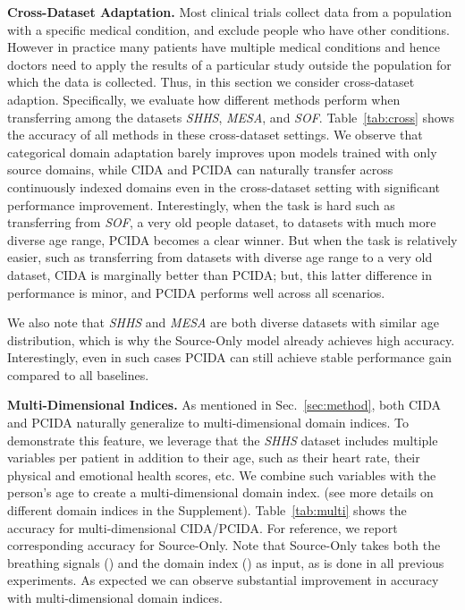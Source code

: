 \documentclass{article}
\newcommand{\tabref}[1]{Table~\ref{#1}}
\newcommand{\secref}[1]{Sec.~\ref{#1}}
\begin{document}
\textbf{Cross-Dataset Adaptation.}
Most clinical trials collect data from a population with a specific medical condition, and exclude people who have other conditions. However in practice many patients have multiple medical conditions and hence doctors need to apply the results of a particular study outside the population for which the data is collected.  Thus, in this section we consider cross-dataset adaption. Specifically, we evaluate how different methods perform when transferring among the datasets \emph{SHHS}, \emph{MESA}, and \emph{SOF}. \tabref{tab:cross} shows the accuracy of all methods in these cross-dataset settings. We observe that categorical domain adaptation barely improves upon models trained with only source domains, while CIDA and PCIDA can naturally transfer across continuously indexed domains even in the cross-dataset setting with significant performance improvement. Interestingly, when the task is hard such as transferring from \emph{SOF}, a very old people dataset, to datasets with much more diverse age range, PCIDA becomes a clear winner. But when the task is relatively easier, such as transferring from datasets with diverse age range to a very old dataset, CIDA is marginally better than PCIDA; but, this latter difference in performance is minor, and PCIDA performs well across all scenarios.

We also note that \emph{SHHS} and \emph{MESA} are both diverse datasets with similar age distribution, which is why the Source-Only model already achieves high accuracy. Interestingly, even in such cases PCIDA can still achieve stable performance gain compared to all baselines.



\textbf{Multi-Dimensional Indices.} As mentioned in \secref{sec:method}, both CIDA and PCIDA naturally generalize to multi-dimensional domain indices. To demonstrate this feature, we leverage that the \emph{SHHS} dataset includes multiple variables per patient in addition to their age, such as their heart rate, their physical and emotional health scores, etc. We combine such variables with the person's age to create a multi-dimensional domain index. (see more details on different domain indices in the Supplement). \tabref{tab:multi} shows the accuracy for multi-dimensional CIDA/PCIDA. For reference, we report corresponding accuracy for Source-Only. Note that Source-Only takes both the breathing signals () and the domain index () as input, as is done in all previous experiments. As expected we can observe substantial improvement in accuracy with multi-dimensional domain indices. 
\end{document}
